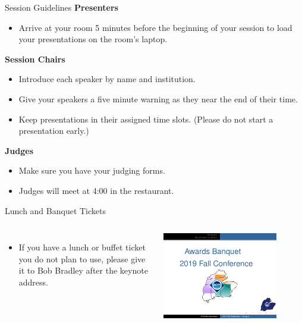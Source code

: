 \documentclass[handout]{beamer}
\begin{document}
\begin{frame}{Session Guidelines}
    \textbf{Presenters}
    \begin{itemize}
        \item Arrive at your room 5 minutes before the beginning of
            your session to load your presentations on the room's
            laptop.
    \end{itemize}

    \textbf{Session Chairs}
    \begin{itemize}
        \item Introduce each speaker by name and institution.
        \item Give your speakers a five minute warning as they near
            the end of their time.
        \item Keep presentations in their assigned time slots. (Please do not
            start a presentation early.)
    \end{itemize}

    \textbf{Judges}
    \begin{itemize}
        \item Make sure you have your judging forms.
        \item Judges will meet at 4:00 in the restaurant.
    \end{itemize}
\end{frame}

\begin{frame}{Lunch and Banquet Tickets}
    \begin{columns}
    \begin{itemize}
        \item If you have a lunch or buffet ticket you do not plan to
            use, please give it to Bob Bradley after the keynote address.
    \end{itemize}
    \begin{center}
        \includegraphics[width=0.8\textwidth]{banquet}
    \end{center}
    \end{columns}
\end{frame}
\end{document}
